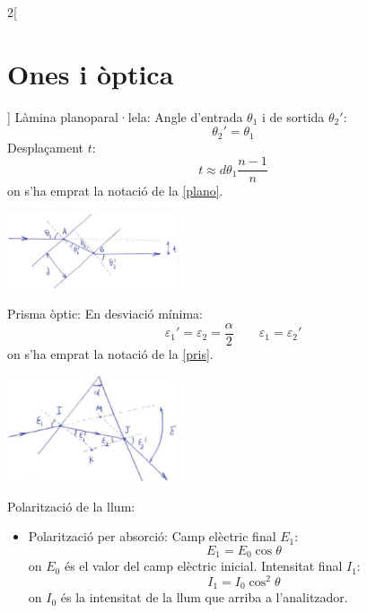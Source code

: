 \documentclass[../../../main.tex]{subfiles}
\begin{document}
\begin{multicols}{2}[\section{Ones i òptica}]
  Làmina planoparal·lela:\newline
  Angle d'entrada $\theta_1$ i de sortida $\theta_2'$: $$\theta_2'=\theta_1$$
  Desplaçament $t$: $$t\approx d\theta_1\frac{n-1}{n}$$
  {\footnotesize on s'ha emprat la notació de la \cref{plano}.}\newline
  \begin{minipage}{\linewidth}
    \includegraphics[width=5cm]{Physics/1st/Waves_and_optics/Images/plano.jpg}
    \label{plano}
  \end{minipage}
  Prisma òptic: \newline
  En desviació mínima: $$\varepsilon_1'=\varepsilon_2=\frac{\alpha}{2}\qquad\varepsilon_1=\varepsilon_2'$$ {\footnotesize on s'ha emprat la notació de la \cref{pris}.}\newline
  \begin{minipage}{\linewidth}
    \includegraphics[width=5cm]{Physics/1st/Waves_and_optics/Images/prisma.jpg}
    \label{pris}
  \end{minipage}
  Polarització de la llum:
  \begin{itemize}
    \item Polarització per absorció:\newline
          Camp elèctric final $E_1$:
          \begin{equation*}
            E_1=E_0\cos\theta
          \end{equation*}
          {\footnotesize on $E_0$ és el valor del camp elèctric inicial.}
          Intensitat final $I_1$:
          \begin{equation*}
            I_1=I_0\cos^2\theta
          \end{equation*}
          {\footnotesize on $I_0$ és la intensitat de la llum que arriba a l'analitzador.}\newline

\end{itemize}
\end{multicols}
\end{document}
